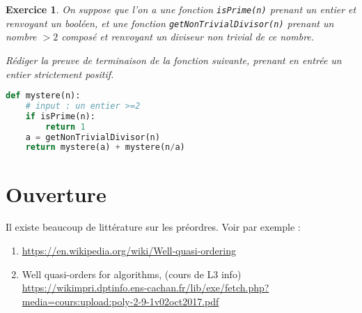 \documentclass[12pt]{article}
\newtheorem*{exo}{Exercice}
\begin{document}
\begin{exo}
On suppose que l'on a une fonction \texttt{isPrime(n)} prenant  un entier et renvoyant un booléen, et une fonction \texttt{getNonTrivialDivisor(n)} prenant un nombre $>2$ composé et renvoyant un diviseur non trivial de ce nombre.

Rédiger la preuve de terminaison de la fonction suivante, prenant en entrée un entier strictement positif.
\begin{lstlisting}[language=Python]
def mystere(n):
	# input : un entier >=2 
	if isPrime(n):
		return 1
	a = getNonTrivialDivisor(n)
	return mystere(a) + mystere(n/a)
\end{lstlisting}
\end{exo}

\section{Ouverture}

Il existe beaucoup de littérature sur les préordres. Voir par exemple :
\begin{enumerate}
\item \url{https://en.wikipedia.org/wiki/Well-quasi-ordering}
\item Well quasi-orders for algorithms, (cours de L3 info) \url{https://wikimpri.dptinfo.ens-cachan.fr/lib/exe/fetch.php?media=cours:upload:poly-2-9-1v02oct2017.pdf}
\end{enumerate}
\end{document}
